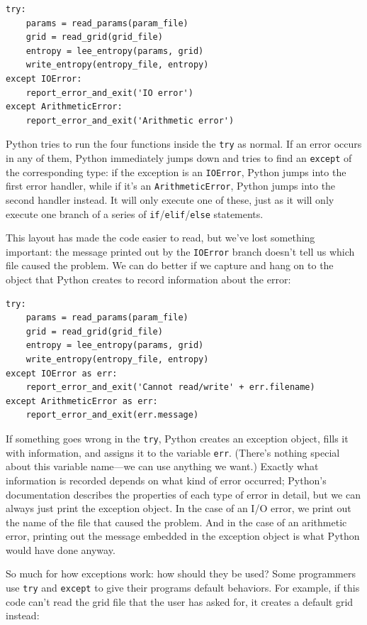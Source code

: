 \documentclass{book}
\begin{document}
\begin{verbatim}
try:
    params = read_params(param_file)
    grid = read_grid(grid_file)
    entropy = lee_entropy(params, grid)
    write_entropy(entropy_file, entropy)
except IOError:
    report_error_and_exit('IO error')
except ArithmeticError:
    report_error_and_exit('Arithmetic error')
\end{verbatim}

Python tries to run the four functions inside the \texttt{try} as
normal. If an error occurs in any of them, Python immediately jumps down
and tries to find an \texttt{except} of the corresponding type: if the
exception is an \texttt{IOError}, Python jumps into the first error
handler, while if it's an \texttt{ArithmeticError}, Python jumps into
the second handler instead. It will only execute one of these, just as
it will only execute one branch of a series of
\texttt{if}/\texttt{elif}/\texttt{else} statements.

This layout has made the code easier to read, but we've lost something
important: the message printed out by the \texttt{IOError} branch
doesn't tell us which file caused the problem. We can do better if we
capture and hang on to the object that Python creates to record
information about the error:

\begin{verbatim}
try:
    params = read_params(param_file)
    grid = read_grid(grid_file)
    entropy = lee_entropy(params, grid)
    write_entropy(entropy_file, entropy)
except IOError as err:
    report_error_and_exit('Cannot read/write' + err.filename)
except ArithmeticError as err:
    report_error_and_exit(err.message)
\end{verbatim}

If something goes wrong in the \texttt{try}, Python creates an exception
object, fills it with information, and assigns it to the variable
\texttt{err}. (There's nothing special about this variable name---we can
use anything we want.) Exactly what information is recorded depends on
what kind of error occurred; Python's documentation describes the
properties of each type of error in detail, but we can always just print
the exception object. In the case of an I/O error, we print out the name
of the file that caused the problem. And in the case of an arithmetic
error, printing out the message embedded in the exception object is what
Python would have done anyway.

So much for how exceptions work: how should they be used? Some
programmers use \texttt{try} and \texttt{except} to give their programs
default behaviors. For example, if this code can't read the grid file
that the user has asked for, it creates a default grid instead:
\end{document}
